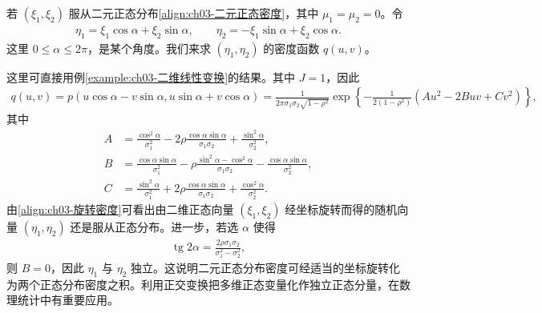 \documentclass[../../main.tex]{subfiles}
\begin{document}
\begin{example}[二维正态的旋转变换]\label{example:ch03-正态旋转}
若 $(\xi_1,\xi_2)$ 服从二元正态分布\eqref{align:ch03-二元正态密度}，其中 $\mu_1=\mu_2=0$。令
\begin{align*}\eta_1=\xi_1\cos\alpha+\xi_2\sin\alpha,\qquad \eta_2=-\xi_1\sin\alpha+\xi_2\cos\alpha.\end{align*}
这里 $0\leqslant\alpha\leqslant 2\pi$，是某个角度。我们来求 $(\eta_1,\eta_2)$ 的密度函数 $q(u,v)$。

这里可直接用例\ref{example:ch03-二维线性变换}的结果。其中 $J=1$，因此
\begin{align}
q(u,v)=p(u\cos\alpha-v\sin\alpha,u\sin\alpha+v\cos\alpha)
=\frac{1}{2\pi\sigma_1\sigma_2\sqrt{1-\rho^{2}}}\exp\left\{-\frac{1}{2(1-\rho^{2})}(Au^{2}-2Buv+Cv^{2})\right\},\label{align:ch03-旋转密度}
\end{align}
其中
\begin{align*}
A&=\frac{\cos^{2}\alpha}{\sigma_1^{2}}-2\rho\frac{\cos\alpha\sin\alpha}{\sigma_1\sigma_2}+\frac{\sin^{2}\alpha}{\sigma_2^{2}},\\
B&=\frac{\cos\alpha\sin\alpha}{\sigma_1^{2}}-\rho\frac{\sin^{2}\alpha-\cos^{2}\alpha}{\sigma_1\sigma_2}-\frac{\cos\alpha\sin\alpha}{\sigma_2^{2}},\\
C&=\frac{\sin^{2}\alpha}{\sigma_1^{2}}+2\rho\frac{\cos\alpha\sin\alpha}{\sigma_1\sigma_2}+\frac{\cos^{2}\alpha}{\sigma_2^{2}}.
\end{align*}
由\eqref{align:ch03-旋转密度}可看出由二维正态向量 $(\xi_1,\xi_2)$ 经坐标旋转而得的随机向量 $(\eta_1,\eta_2)$ 还是服从正态分布。进一步，若选 $\alpha$ 使得
\begin{align}
\operatorname{tg}2\alpha=\frac{2\rho\sigma_1\sigma_2}{\sigma_1^{2}-\sigma_2^{2}},\label{align:ch03-旋转角}
\end{align}
则 $B=0$，因此 $\eta_1$ 与 $\eta_2$ 独立。这说明二元正态分布密度可经适当的坐标旋转化为两个正态分布密度之积。利用正交变换把多维正态变量化作独立正态分量，在数理统计中有重要应用。
\end{example}
\end{document}
